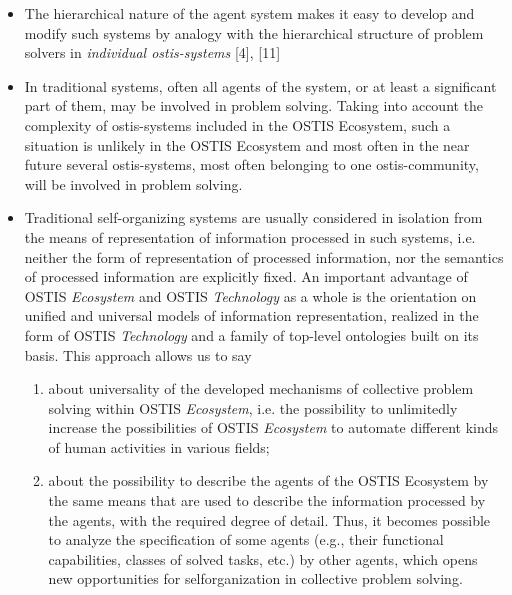 \documentclass[12pt, a4paper]{article}
\begin{document}
\fontsize{10}{15}\selectfont
\begin{multicols}{2}
\setlength{\parindent}{0.8cm}
\setlength{\parindent}{0.4cm}
\fontsize{10}{15}\selectfont

\begin{itemize}
\setlength{\itemsep}{0pt}
  \setlength{\parskip}{1pt}
  \setlength{\parsep}{0pt}
\item[]  The hierarchical nature of the agent system makes it
easy to develop and modify such systems by analogy
with the hierarchical structure of problem solvers in
\textit{individual ostis-systems} [4], [11]
\item   In traditional systems, often all agents of the system,
or at least a significant part of them, may be
involved in problem solving. Taking into account the
complexity of ostis-systems included in the OSTIS
Ecosystem, such a situation is unlikely in the OSTIS
Ecosystem and most often in the near future several
ostis-systems, most often belonging to one ostis-community, will be involved in problem solving.
\item  Traditional self-organizing systems are usually considered in isolation from the means of representation of information processed in such systems, i.e. neither the form of representation of processed
information, nor the semantics of processed information are explicitly fixed. An important advantage of OSTIS \textit{Ecosystem} and OSTIS \textit{Technology} as a whole is the orientation on unified and universal
models of information representation, realized in the form of OSTIS \textit {Technology} and a family of top-level ontologies built on its basis. This approach allows us to say
\begin{enumerate}[label=\textbf{--},leftmargin=*]   
\setlength{\itemsep}{0pt}
  \setlength{\parskip}{1pt}
  \setlength{\parsep}{0pt}
\item about universality of the developed mechanisms
of collective problem solving within OSTIS \textit {Ecosystem}, i.e. the possibility to unlimitedly increase the possibilities of OSTIS \textit {Ecosystem} to
automate different kinds of human activities in various fields;
\item about the possibility to describe the agents of
the OSTIS Ecosystem by the same means that
are used to describe the information processed
by the agents, with the required degree of detail. Thus, it becomes possible to analyze the
specification of some agents (e.g., their functional
capabilities, classes of solved tasks, etc.) by other
agents, which opens new opportunities for selforganization in collective problem solving.

\end{enumerate}
\end{itemize}
\end{multicols}
\end{document}
